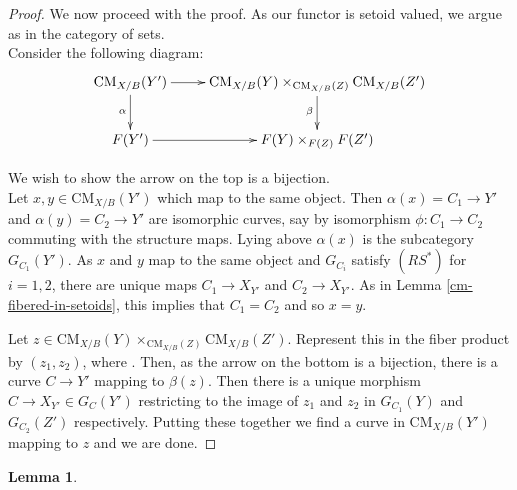 \documentclass{stacks-project}
\theoremstyle{plain}
\newtheorem{lemma}[subsection]{Lemma}
\theoremstyle{definition}
\theoremstyle{remark}
\numberwithin{equation}{subsection}
\def\CMfunctor{\mathcal{C}\!{\it oh}}
\def\CMfunctor{\text{CM}}
\begin{document}
\begin{proof}
We now proceed with the proof. As our functor is setoid valued, we argue as in the category of sets.\\

Consider the following diagram:
$$
\xymatrix{
\CMfunctor_{X/B}(Y') \ar[r] \ar[d]_\alpha & \CMfunctor_{X/B}(Y)\times_{\CMfunctor_{X/B}(Z)} \CMfunctor_{X/B}(Z') \ar[d] _\beta\\
F(Y') \ar[r] & F(Y)\times_{F(Z)} F(Z')}
$$

We wish to show the arrow on the top is a bijection.\\

Let $x,y \in \CMfunctor_{X/B}(Y')$ which map to the same object. Then $\alpha(x) = C_1 \to Y'$ and $\alpha(y) = C_2 \to Y'$ are isomorphic curves, say by isomorphism $\phi: C_1 \to C_2$ commuting with the structure maps. Lying above $\alpha(x)$ is the subcategory $G_{C_1}(Y')$. As $x$ and $y$ map to the same object and $G_{C_i}$ satisfy $(RS^*)$ for $i=1,2$, there are unique maps $C_1 \to X_{Y'}$ and $C_2 \to X_{Y'}$. As in Lemma \ref{cm-fibered-in-setoids}, this implies that $C_1=C_2$ and so $x=y$.

Let $z \in \CMfunctor_{X/B}(Y)\times_{\CMfunctor_{X/B}(Z)} \CMfunctor_{X/B}(Z')$. Represent this in the fiber product by $(z_1,z_2)$, where . Then, as the arrow on the bottom is a bijection, there is a curve $C \to Y'$ mapping to $\beta(z)$. Then there is a unique morphism $C \to X_{Y'} \in G_C(Y')$ restricting to the image of $z_1$ and $z_2$ in $G_{C_1}(Y)$ and $G_{C_2}(Z')$ respectively. Putting these together we find a curve in $\CMfunctor_{X/B}(Y')$ mapping to $z$ and we are done.
\end{proof}

\begin{lemma}
	
	\label{lemma-coherent-stack}
\end{lemma}
\end{document}
